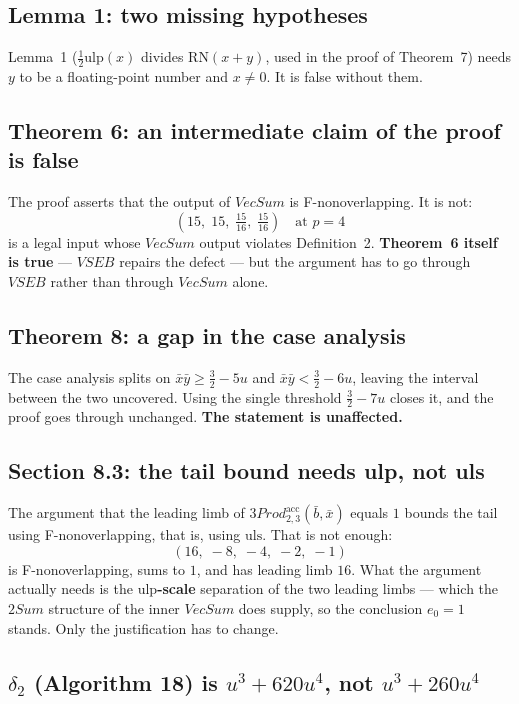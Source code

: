 \documentclass[11pt,a4paper]{article}
\newcommand{\RN}{\mathrm{RN}}
\newcommand{\ulp}{\mathrm{ulp}}
\newcommand{\uls}{\mathrm{uls}}
\newcommand{\alg}[1]{\mathit{#1}}
\newcommand{\Prodacc}[1]{\alg{3Prod}^{\mathrm{acc}}_{#1}}
\begin{document}
\subsection{Lemma 1: two missing hypotheses}

Lemma~1 ($\frac12\ulp(x)$ divides $\RN(x+y)$, used in the proof of Theorem~7)
needs $y$ to be a floating-point number and $x \neq 0$. It is false without
them.

\subsection{Theorem 6: an intermediate claim of the proof is
false}\label{sec:thm6}

The proof asserts that the output of $\alg{VecSum}$ is F-nonoverlapping. It is
not:
\[
  (15,\; 15,\; \tfrac{15}{16},\; \tfrac{15}{16}) \quad\text{at } p = 4
\]
is a legal input whose $\alg{VecSum}$ output violates Definition~2.
\textbf{Theorem~6 itself is true} --- $\alg{VSEB}$ repairs the defect --- but
the argument has to go through $\alg{VSEB}$ rather than through
$\alg{VecSum}$ alone.

\subsection{Theorem 8: a gap in the case analysis}\label{sec:thm8}

The case analysis splits on $\bar x\bar y \geq \frac32 - 5u$ and
$\bar x\bar y < \frac32 - 6u$, leaving the interval between the two uncovered.
Using the single threshold $\frac32 - 7u$ closes it, and the proof goes through
unchanged. \textbf{The statement is unaffected.}

\subsection{Section 8.3: the tail bound needs ulp, not uls}

The argument that the leading limb of $\Prodacc{2,3}(\bar b, \bar x)$ equals
$1$ bounds the tail using F-nonoverlapping, that is, using $\uls$. That is not
enough:
\[
  (16,\; -8,\; -4,\; -2,\; -1)
\]
is F-nonoverlapping, sums to $1$, and has leading limb $16$. What the argument
actually needs is the \textbf{$\ulp$-scale} separation of the two leading
limbs --- which the $\alg{2Sum}$ structure of the inner $\alg{VecSum}$ does
supply, so the conclusion $e_0 = 1$ stands. Only the justification has to
change.

\subsection{$\delta_2$ (Algorithm 18) is $u^3 + 620u^4$, not
$u^3 + 260u^4$}\label{sec:delta2}
\end{document}
